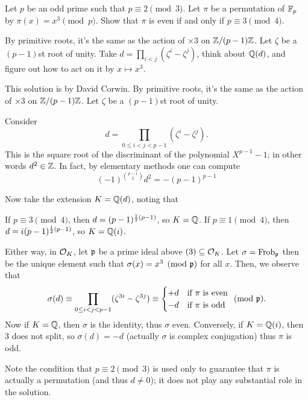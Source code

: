 \begin{problem}
	[Putnam 2012 B6]
	\twochili
	Let $p$ be an odd prime such that $p \equiv 2 \pmod 3$.
	Let $\pi$ be a permutation of $\mathbb F_p$ by $\pi(x) = x^3 \pmod p$.
	Show that $\pi$ is even if and only if $p \equiv 3 \pmod 4$.
	\begin{hint}
		By primitive roots, it's the same as the action of $\times 3$ on $\mathbb Z/(p-1)\mathbb Z$.
		Let $\zeta$ be a $(p-1)$st root of unity.
		Take $d = \prod_{i < j} (\zeta^i - \zeta^j)$, think about $\mathbb Q(d)$,
		and figure out how to act on it by $x \mapsto x^3$.
	\end{hint}
	\begin{sol}
		This solution is by David Corwin.
		By primitive roots, it's the same as the action of $\times 3$ on $\mathbb Z/(p-1)\mathbb Z$.
		Let $\zeta$ be a $(p-1)$st root of unity.

		Consider
		\[ d = \prod_{0 \le i < j < p-1} (\zeta^i - \zeta^j). \]
		This is the square root of the discriminant of
		the polynomial $X^{p-1}-1$; in other words $d^2 \in \mathbb Z$.
		In fact, by elementary methods one can compute
		\[ (-1)^{\binom{p-1}{2}} d^2 = -(p-1)^{p-1} \]

		Now take the extension $K = \mathbb Q(d)$, noting that
		\begin{itemize}
			\ii If $p \equiv 3 \pmod 4$, then $d = (p-1)^{\frac{1}{2}(p-1)}$, so $K = \mathbb Q$.
			\ii If $p \equiv 1 \pmod 4$, then $d = i(p-1)^{\frac{1}{2}(p-1)}$, so $K = \mathbb Q(i)$.
		\end{itemize}
		Either way, in $\mathcal O_K$, let $\mathfrak p$ be a prime ideal above $(3) \subseteq \mathcal O_K$.
		Let $\sigma = \mathrm{Frob}_\mathfrak p$ then be the unique element such that
		$\sigma(x) = x^3 \pmod{\mathfrak p}$ for all $x$.
		Then, we observe that
		\[
			\sigma(d) \equiv \prod_{0 \le i < j < p-1} (\zeta^{3i} - \zeta^{3j})
			\equiv \begin{cases}
				+d & \text{if $\pi$ is even} \\
				-d & \text{if $\pi$ is odd}
			\end{cases} \pmod{\mathfrak p}.
		\]
		Now if $K = \mathbb Q$, then $\sigma$ is the identity, thus $\sigma$ even.
		Conversely, if $K = \mathbb Q(i)$, then $3$ does not split, so $\sigma(d) = -d$
		(actually $\sigma$ is complex conjugation) thus $\pi$ is odd.

		Note the condition that $p \equiv 2 \pmod 3$ is used only
		to guarantee that $\pi$ is actually a permutation (and thus $d \neq 0$);
		it does not play any substantial role in the solution.
	\end{sol}
\end{problem}
